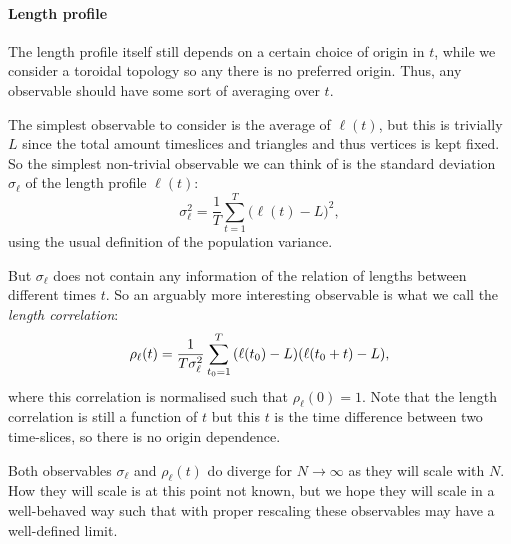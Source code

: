 \paragraph{Length profile}
The length profile itself still depends on a certain choice of origin in $t$, while we consider a toroidal topology so any there is no preferred origin. Thus, any observable should have some sort of averaging over $t$.

The simplest observable to consider is the average of $\ell(t)$, but this is trivially $L$ since the total amount timeslices and triangles and thus vertices is kept fixed.
So the simplest non-trivial observable we can think of is the standard deviation $\sigma_\ell$ of the length profile $\ell(t)$:
\begin{equation}
    \sigma_\ell^2 = \frac{1}{T} \sum_{t = 1}^{T} \Big(\ell(t) - L\Big)^2,
\end{equation}
using the usual definition of the population variance.

But $\sigma_\ell$ does not contain any information of the relation of lengths between different times $t$.
So an arguably more interesting observable is what we call the \emph{length correlation}:
\begin{equation}
    \rho_\ell(t) = \frac{1}{T \sigma_\ell^2} \sum_{t_0 = 1}^{T} \qty(\ell(t_0) - L)\qty(\ell(t_0 + t) - L),
\end{equation}
where this correlation is normalised such that $\rho_\ell(0) = 1$.
Note that the length correlation is still a function of $t$ but this $t$ is the time difference between two time-slices, so there is no origin dependence.

Both observables $\sigma_\ell$ and $\rho_\ell(t)$ do diverge for $N \rightarrow \infty$ as they will scale with $N$.
How they will scale is at this point not known, but we hope they will scale in a well-behaved way such that with proper rescaling these observables may have a well-defined limit.